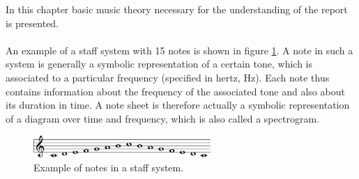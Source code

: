 In this chapter basic music theory necessary for the understanding of the report is presented.
\\ \\
An example of a staff system with 15 notes is shown in figure \ref{fig:cmajor}. A note in such a system is generally a symbolic representation of a certain tone, which is associated to a particular frequency (specified in hertz, Hz). Each note thus contains information about the frequency of the associated tone and also about its duration in time. A note sheet is therefore actually a symbolic representation of a diagram over time and frequency, which is also called a spectrogram.

\begin{figure}[H]
    \centering
    \includegraphics[width = 0.6\textwidth]{figures/Music/Cmajor.png}
    \caption{Example of notes in a staff system.}
    \label{fig:cmajor}
\end{figure}

